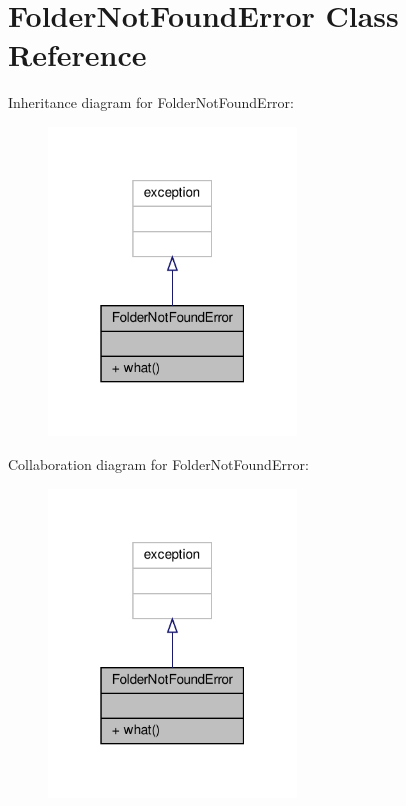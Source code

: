 \hypertarget{classFolderNotFoundError}{}\section{Folder\+Not\+Found\+Error Class Reference}
\label{classFolderNotFoundError}


Inheritance diagram for Folder\+Not\+Found\+Error\+:
\nopagebreak
\begin{figure}[H]
\begin{center}
\leavevmode
\includegraphics[width=187pt]{classFolderNotFoundError__inherit__graph}
\end{center}
\end{figure}


Collaboration diagram for Folder\+Not\+Found\+Error\+:
\nopagebreak
\begin{figure}[H]
\begin{center}
\leavevmode
\includegraphics[width=187pt]{classFolderNotFoundError__coll__graph}
\end{center}
\end{figure}
